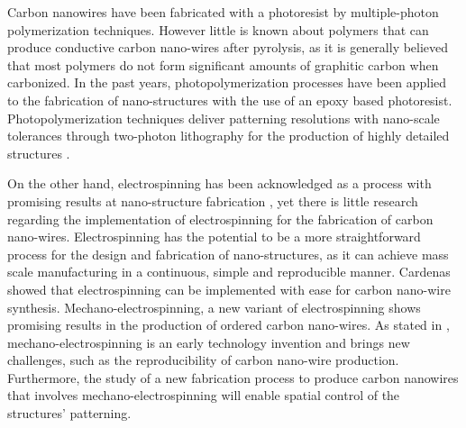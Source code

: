 Carbon nanowires have been fabricated with a photoresist by multiple-photon polymerization techniques. However little is known about polymers that can produce conductive carbon nano-wires after pyrolysis, as it is generally believed that most polymers do not form significant amounts of graphitic carbon when carbonized.
In the past years, photopolymerization processes have been applied to the fabrication of nano-structures with the use of an epoxy based photoresist. \cite{Boer2014} Photopolymerization techniques deliver patterning resolutions with nano-scale tolerances through two-photon lithography for the production of highly detailed structures \cite{Hribar2014}.

On the other hand, electrospinning has been acknowledged as a process with promising results at nano-structure fabrication \cite{Boer2014}, yet there is little research regarding the implementation of electrospinning for the fabrication of carbon nano-wires. Electrospinning has the potential to be a more straightforward process for the design and fabrication of nano-structures, as it can achieve mass scale manufacturing in a continuous, simple and reproducible manner. Cardenas \cite{Cardenas2017} showed that electrospinning can be implemented with ease for carbon nano-wire synthesis. Mechano-electrospinning, a new variant of electrospinning shows promising results in the production of ordered carbon nano-wires. As stated in \cite{Cardenas2017}, mechano-electrospinning is an early technology invention and brings new challenges, such as the reproducibility of carbon nano-wire production. Furthermore, the study of a new fabrication process to produce carbon nanowires that involves mechano-electrospinning will enable spatial control of the structures' patterning.

